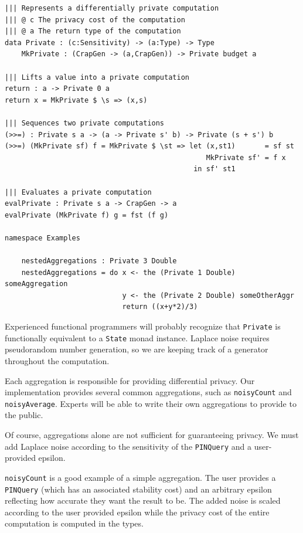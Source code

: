 \documentclass[12pt]{report}
\begin{document}
\begin{lstlisting}[caption={Representing differentially private mechanisms},label={lst:mechanisms}]
||| Represents a differentially private computation
||| @ c The privacy cost of the computation
||| @ a The return type of the computation
data Private : (c:Sensitivity) -> (a:Type) -> Type
    MkPrivate : (CrapGen -> (a,CrapGen)) -> Private budget a

||| Lifts a value into a private computation
return : a -> Private 0 a
return x = MkPrivate $ \s => (x,s)

||| Sequences two private computations
(>>=) : Private s a -> (a -> Private s' b) -> Private (s + s') b
(>>=) (MkPrivate sf) f = MkPrivate $ \st => let (x,st1)       = sf st
                                                MkPrivate sf' = f x
                                             in sf' st1

||| Evaluates a private computation
evalPrivate : Private s a -> CrapGen -> a
evalPrivate (MkPrivate f) g = fst (f g)

namespace Examples

    nestedAggregations : Private 3 Double
    nestedAggregations = do x <- the (Private 1 Double) someAggregation
                            y <- the (Private 2 Double) someOtherAggr
                            return ((x+y*2)/3)
\end{lstlisting}

Experienced functional programmers will probably recognize that \texttt{Private} is functionally equivalent to a \texttt{State} monad instance.
Laplace noise requires pseudorandom number generation, so we are keeping track of a generator throughout the computation.

Each aggregation is responsible for providing differential privacy.
Our implementation provides several common aggregations, such as \texttt{noisyCount} and \texttt{noisyAverage}.
Experts will be able to write their own aggregations to provide to the public.

Of course, aggregations alone are not sufficient for guaranteeing privacy.
We must add Laplace noise according to the sensitivity of the \texttt{PINQuery} and a user-provided epsilon.

\texttt{noisyCount} is a good example of a simple aggregation.
The user provides a \texttt{PINQuery} (which has an associated stability cost) and an arbitrary epsilon reflecting how accurate they want the result to be.
The added noise is scaled according to the user provided epsilon while the privacy cost of the entire computation is computed in the types.
\end{document}
